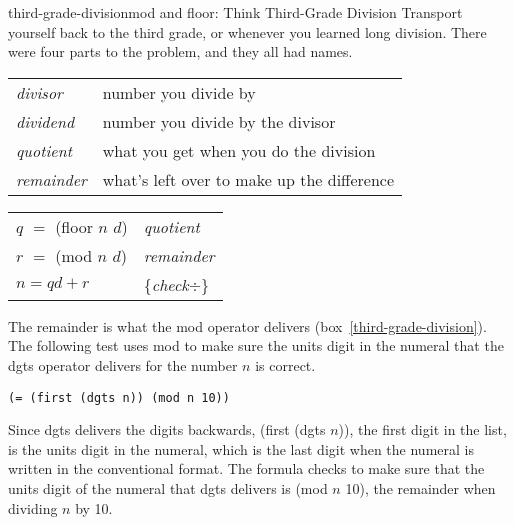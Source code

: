 \begin{aside}{third-grade-division}{\textsf{mod} and \textsf{floor}: Think Third-Grade Division}
Transport yourself back to the third grade,
or whenever you learned long division.
There were four parts to the problem, and they all had names.

\begin{tabular}{ll}
\emph{divisor}   & number you divide by \\
\emph{dividend}  & number you divide by the divisor \\
\emph{quotient}  & what you get when you do the division \\
\emph{remainder} & what's left over to make up the difference
\end{tabular}
\begin{center}
\begin{tabular}{ll}
$q$ $=$ \textsf{(floor $n$ $d$)} & \emph{quotient}  \\
$r$ $=$ \textsf{(mod $n$ $d$)}   & \emph{remainder} \\
$n = qd + r$            & \{\emph{check}$\div$\} \\
\end{tabular}
\end{center}
\end{aside}

The remainder is
what the \textsf{mod} operator delivers
(box~\ref{third-grade-division}). %
The following test uses \textsf{mod} to make sure the units digit in the numeral
that the \textsf{dgts} operator delivers for the number $n$ is correct.
\begin{code}
\begin{verbatim}
(= (first (dgts n)) (mod n 10))
\end{verbatim}
\end{code}

Since \textsf{dgts} delivers the digits backwards,
\textsf{(first (dgts $n$))}, the first digit in the list,
is the units digit in the numeral, which is the last digit
when the numeral is written in the conventional format.
The formula checks to make sure that
the units digit of the numeral that
\textsf{dgts} delivers is \textsf{(mod $n$ 10)},
the remainder when dividing $n$ by 10.

